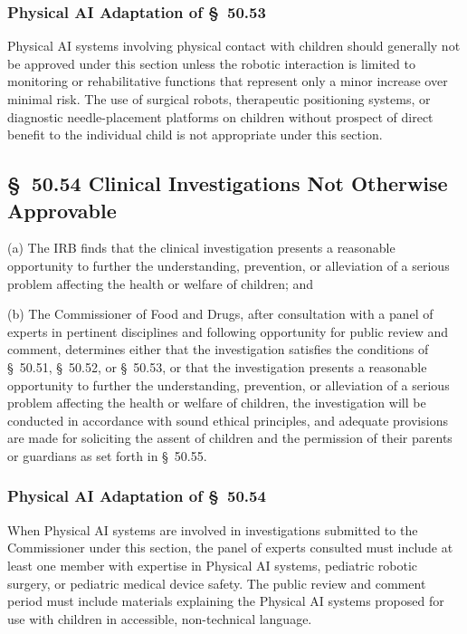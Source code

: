 \documentclass[11pt]{article}
\begin{document}
\subsubsection{Physical AI Adaptation of \S~50.53}

Physical AI systems involving physical contact with children should generally not be approved under this section unless the robotic interaction is limited to monitoring or rehabilitative functions that represent only a minor increase over minimal risk. The use of surgical robots, therapeutic positioning systems, or diagnostic needle-placement platforms on children without prospect of direct benefit to the individual child is not appropriate under this section.

\subsection{\S~50.54 Clinical Investigations Not Otherwise Approvable}

(a) The IRB finds that the clinical investigation presents a reasonable opportunity to further the understanding, prevention, or alleviation of a serious problem affecting the health or welfare of children; and

(b) The Commissioner of Food and Drugs, after consultation with a panel of experts in pertinent disciplines and following opportunity for public review and comment, determines either that the investigation satisfies the conditions of \S~50.51, \S~50.52, or \S~50.53, or that the investigation presents a reasonable opportunity to further the understanding, prevention, or alleviation of a serious problem affecting the health or welfare of children, the investigation will be conducted in accordance with sound ethical principles, and adequate provisions are made for soliciting the assent of children and the permission of their parents or guardians as set forth in \S~50.55.

\subsubsection{Physical AI Adaptation of \S~50.54}

When Physical AI systems are involved in investigations submitted to the Commissioner under this section, the panel of experts consulted must include at least one member with expertise in Physical AI systems, pediatric robotic surgery, or pediatric medical device safety. The public review and comment period must include materials explaining the Physical AI systems proposed for use with children in accessible, non-technical language.
\end{document}
